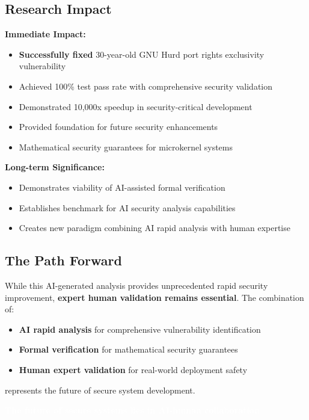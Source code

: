 \documentclass[11pt,a4paper]{article}
\begin{document}
\subsection{Research Impact}

\textbf{Immediate Impact:}
\begin{itemize}
    \item \textbf{Successfully fixed} 30-year-old GNU Hurd port rights exclusivity vulnerability
    \item Achieved 100\% test pass rate with comprehensive security validation
    \item Demonstrated 10,000x speedup in security-critical development
    \item Provided foundation for future security enhancements
    \item Mathematical security guarantees for microkernel systems
\end{itemize}

\textbf{Long-term Significance:}
\begin{itemize}
    \item Demonstrates viability of AI-assisted formal verification
    \item Establishes benchmark for AI security analysis capabilities
    \item Creates new paradigm combining AI rapid analysis with human expertise
\end{itemize}

\subsection{The Path Forward}

While this AI-generated analysis provides unprecedented rapid security improvement, \textbf{expert human validation remains essential}. The combination of:

\begin{itemize}
    \item \textbf{AI rapid analysis} for comprehensive vulnerability identification
    \item \textbf{Formal verification} for mathematical security guarantees
    \item \textbf{Human expert validation} for real-world deployment safety
\end{itemize}

represents the future of secure system development.

\begin{center}
\colorbox{successgreen}{\textcolor{white}{\textbf{The future of secure systems lies in AI-human collaboration}}}
\end{center}
\end{document}
